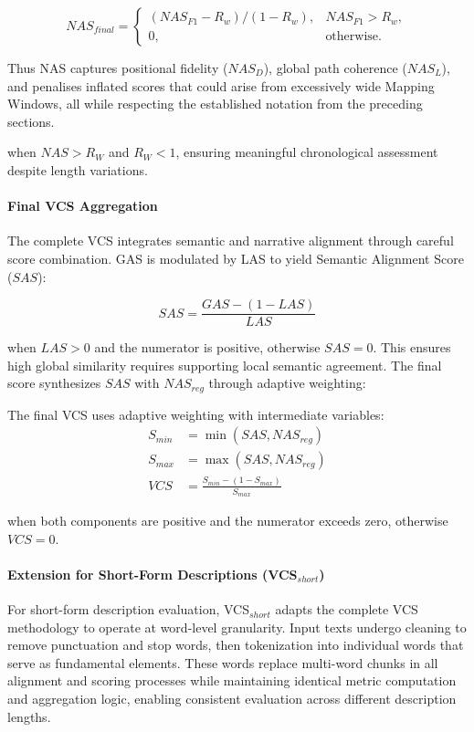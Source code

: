 \documentclass[letterpaper]{article} %
\begin{document}
\begin{equation}
NAS_{final} = \begin{cases}
(NAS_{F1} - R_w)/(1 - R_w), & NAS_{F1} > R_w, \\
0, & \text{otherwise}.
\end{cases}
\end{equation}

Thus NAS captures positional fidelity ($NAS_D$), global path coherence ($NAS_L$), and penalises inflated scores that could arise from excessively wide Mapping Windows, all while respecting the established notation from the preceding sections.


when $NAS > R_W$ and $R_W < 1$, ensuring meaningful chronological assessment despite length variations.

\paragraph{Final VCS Aggregation}
The complete VCS integrates semantic and narrative alignment through careful score combination. GAS is modulated by LAS to yield Semantic Alignment Score ($SAS$):

\begin{equation} \label{eq:sas_revised} 
SAS = \frac{GAS - (1 - LAS)}{LAS}
\end{equation}

when $LAS > 0$ and the numerator is positive, otherwise $SAS = 0$. This ensures high global similarity requires supporting local semantic agreement. The final score synthesizes $SAS$ with $NAS_{reg}$ through adaptive weighting:

The final VCS uses adaptive weighting with intermediate variables:
\begin{align}
S_{min} &= \min(SAS, NAS_{reg}) \label{eq:s_min} \\
S_{max} &= \max(SAS, NAS_{reg}) \label{eq:s_max} \\
VCS &= \frac{S_{min} - (1 - S_{max})}{S_{max}} \label{eq:vcs_final}
\end{align}

when both components are positive and the numerator exceeds zero, otherwise $VCS = 0$.

\paragraph{Extension for Short-Form Descriptions (VCS$_{short}$)}
For short-form description evaluation, VCS$_{short}$ adapts the complete VCS methodology to operate at word-level granularity. Input texts undergo cleaning to remove punctuation and stop words, then tokenization into individual words that serve as fundamental elements. These words replace multi-word chunks in all alignment and scoring processes while maintaining identical metric computation and aggregation logic, enabling consistent evaluation across different description lengths.
\end{document}
